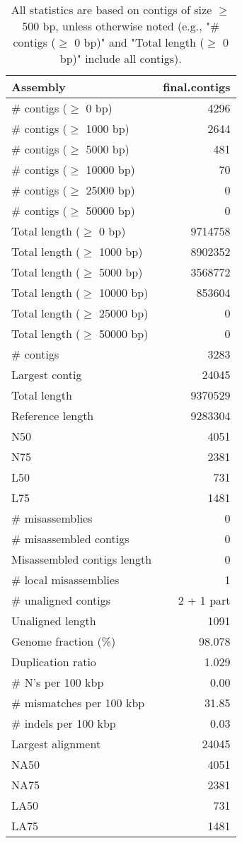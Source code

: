 \documentclass[12pt,a4paper]{article}
\begin{document}
\begin{table}[ht]
\begin{center}
\caption{All statistics are based on contigs of size $\geq$ 500 bp, unless otherwise noted (e.g., "\# contigs ($\geq$ 0 bp)" and "Total length ($\geq$ 0 bp)" include all contigs).}
\begin{tabular}{|l*{1}{|r}|}
\hline
Assembly & final.contigs \\ \hline
\# contigs ($\geq$ 0 bp) & 4296 \\ \hline
\# contigs ($\geq$ 1000 bp) & 2644 \\ \hline
\# contigs ($\geq$ 5000 bp) & 481 \\ \hline
\# contigs ($\geq$ 10000 bp) & 70 \\ \hline
\# contigs ($\geq$ 25000 bp) & 0 \\ \hline
\# contigs ($\geq$ 50000 bp) & 0 \\ \hline
Total length ($\geq$ 0 bp) & 9714758 \\ \hline
Total length ($\geq$ 1000 bp) & 8902352 \\ \hline
Total length ($\geq$ 5000 bp) & 3568772 \\ \hline
Total length ($\geq$ 10000 bp) & 853604 \\ \hline
Total length ($\geq$ 25000 bp) & 0 \\ \hline
Total length ($\geq$ 50000 bp) & 0 \\ \hline
\# contigs & 3283 \\ \hline
Largest contig & 24045 \\ \hline
Total length & 9370529 \\ \hline
Reference length & 9283304 \\ \hline
N50 & 4051 \\ \hline
N75 & 2381 \\ \hline
L50 & 731 \\ \hline
L75 & 1481 \\ \hline
\# misassemblies & 0 \\ \hline
\# misassembled contigs & 0 \\ \hline
Misassembled contigs length & 0 \\ \hline
\# local misassemblies & 1 \\ \hline
\# unaligned contigs & 2 + 1 part \\ \hline
Unaligned length & 1091 \\ \hline
Genome fraction (\%) & 98.078 \\ \hline
Duplication ratio & 1.029 \\ \hline
\# N's per 100 kbp & 0.00 \\ \hline
\# mismatches per 100 kbp & 31.85 \\ \hline
\# indels per 100 kbp & 0.03 \\ \hline
Largest alignment & 24045 \\ \hline
NA50 & 4051 \\ \hline
NA75 & 2381 \\ \hline
LA50 & 731 \\ \hline
LA75 & 1481 \\ \hline
\end{tabular}
\end{center}
\end{table}
\end{document}
